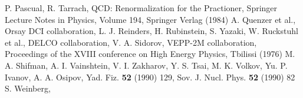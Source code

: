 \begin{thebibliography}{ABC.99}
 P. Pascual, R. Tarrach, QCD: Renormalization 
              for the Practioner, Springer Lecture Notes in Physics,
	      Volume 194, Springer Verlag (1984)
 A. Quenzer et al., Orsay DCI collaboration,
 L. J. Reinders, H. Rubinstein, S. Yazaki,
 W. Ruckstuhl et al., DELCO collaboration, 
 V. A. Sidorov, VEPP-2M collaboration, 
              Proceedings of the XVIII conference on High Energy
	      Physics, Tbilissi (1976) 	      
 M. A. Shifman, A. I. Vainshtein, V. I. Zakharov,
 Y. S. Tsai, 
 M. K. Volkov, Yu. P. Ivanov, A. A. Osipov,
              Yad. Fiz. {\bf 52} (1990) 129, Sov. J. Nucl. Phys. {\bf 52}
	      (1990) 82 	      
 S. Weinberg, 	       	      
\end{thebibliography} 
